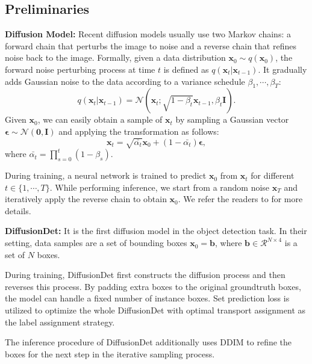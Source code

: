 \documentclass{article}
\begin{document}
\subsection{Preliminaries}


\noindent \textbf{Diffusion Model:} Recent diffusion models usually use two Markov chains: a forward chain that perturbs the image to noise and a reverse chain that refines noise back to the image. Formally, given a data distribution $\mathbf{x}_0 \sim q(\mathbf{x}_0)$, the forward noise perturbing process at time $t$ is defined as $q(\mathbf{x}_t|\mathbf{x}_{t-1})$. It gradually adds Gaussian noise to the data according to a variance schedule $\beta_1,\cdots,\beta_T$:
\begin{equation}\label{eqn.forward}
q(\mathbf{x}_t|\mathbf{x}_{t-1}) = \mathcal{N}(\mathbf{x}_t;\sqrt{1-\beta_t}\mathbf{x}_{t-1},\beta_t\mathbf{I}).
\end{equation}
Given $\mathbf{x}_0$, we can easily obtain a sample of $\mathbf{x}_t$ by sampling a Gaussian vector $\mathbf{\epsilon} \sim \mathcal{N}(\mathbf{0},\mathbf{I})$ and applying the transformation as follows:
\begin{equation}\label{eqn.forward}
\mathbf{x}_t = \sqrt{\bar{\alpha_t}}\mathbf{x}_0+(1-\bar{\alpha_t})\mathbf{\epsilon},
\end{equation}
where $\bar{\alpha_t} = \prod^t_{s=0}(1-\beta_s)$.

During training, a neural network is trained to predict $\mathbf{x}_0$ from $\mathbf{x}_t$ for different $t\in \{1,\cdots,T\}$. While performing inference, we start from a random noise $\mathbf{x}_T$ and iteratively apply the reverse chain to obtain $\mathbf{x}_0$. We refer the readers to \cite{yang2022diffusion} for more details.


\noindent \textbf{DiffusionDet:} It is the first diffusion model in the object detection task. In their setting, data samples are a set of bounding boxes $\mathbf{x}_0=\mathbf{b}$, where $\mathbf{b}\in \mathcal{R}^{N\times 4}$ is a set of $N$ boxes. 

During training, DiffusionDet first constructs the diffusion process and then reverses this process. By padding extra boxes to the original groundtruth boxes, the model can handle a fixed number of instance boxes. Set prediction loss\cite{DETR} is utilized to optimize the whole DiffusionDet with optimal transport assignment\cite{DBLP:journals/corr/abs-2103-14259} as the label assignment strategy.

The inference procedure of DiffusionDet additionally uses DDIM\cite{DBLP:journals/corr/abs-2010-02502} to refine the boxes for the next step in the iterative sampling process. 
\end{document}
